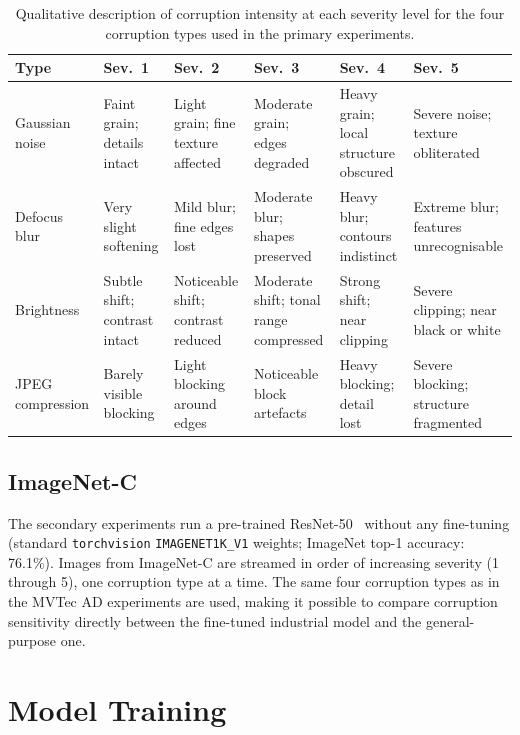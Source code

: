 \begin{table}[h]
  \centering
  \caption[Corruption severity taxonomy]{Qualitative description of corruption intensity at each severity level for the four corruption types used in the primary experiments.}
  \label{tab:corruption-taxonomy}
  \small
  \begin{tabular}{lp{2.0cm}p{2.0cm}p{2.0cm}p{2.0cm}p{2.0cm}}
    \toprule
    \textbf{Type} & \textbf{Sev.\ 1} & \textbf{Sev.\ 2} & \textbf{Sev.\ 3}
      & \textbf{Sev.\ 4} & \textbf{Sev.\ 5} \\
    \midrule
    Gaussian noise   & Faint grain; details intact & Light grain; fine texture affected & Moderate grain; edges degraded & Heavy grain; local structure obscured & Severe noise; texture obliterated \\[4pt]
    Defocus blur     & Very slight softening & Mild blur; fine edges lost & Moderate blur; shapes preserved & Heavy blur; contours indistinct & Extreme blur; features unrecognisable \\[4pt]
    Brightness       & Subtle shift; contrast intact & Noticeable shift; contrast reduced & Moderate shift; tonal range compressed & Strong shift; near clipping & Severe clipping; near black or white \\[4pt]
    JPEG compression & Barely visible blocking & Light blocking around edges & Noticeable block artefacts & Heavy blocking; detail lost & Severe blocking; structure fragmented \\
    \bottomrule
  \end{tabular}
\end{table}

\subsection{ImageNet-C}

The secondary experiments run a pre-trained ResNet-50~\autocite{He2016} without any fine-tuning (standard \texttt{torchvision} \texttt{IMAGENET1K\_V1} weights; ImageNet top-1 accuracy: 76.1\%). Images from ImageNet-C are streamed in order of increasing severity (1 through 5), one corruption type at a time. The same four corruption types as in the MVTec AD experiments are used, making it possible to compare corruption sensitivity directly between the fine-tuned industrial model and the general-purpose one.

\section{Model Training}
\label{sec:model-training}


